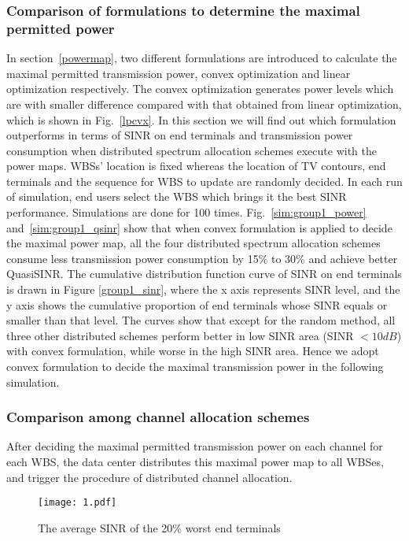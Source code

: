 \subsubsection*{Comparison of formulations to determine the maximal permitted power}
In section~\ref{powermap}, two different formulations are introduced to calculate the maximal permitted transmission power, \ie convex optimization and linear optimization respectively.
The convex optimization generates power levels which are with smaller difference compared with that obtained from linear optimization, which is shown in Fig.~\ref{lpcvx}.
In this section we will find out which formulation outperforms in terms of SINR on end terminals and transmission power consumption when distributed spectrum allocation schemes execute with the power maps.
WBSs' location is fixed whereas the location of TV contours, end terminals and the sequence for WBS to update are randomly decided.
In each run of simulation, end users select the WBS which brings it the best SINR performance.
Simulations are done for 100 times.
Fig.~\ref{sim:group1_power} and~\ref{sim:group1_qsinr} show that when convex formulation is applied to decide the maximal power map, all the four distributed spectrum allocation schemes consume less transmission power consumption by 15\% to 30\% and achieve better QuasiSINR. 
The cumulative distribution function curve of SINR on end terminals is drawn in Figure \ref{group1_sinr}, where the x axis represents SINR level, and the y axis shows the cumulative proportion of end terminals whose SINR equals or smaller than that level. 
The curves show that except for the random method, all three other distributed schemes perform better in low SINR area (SINR $<10 dB$) with convex formulation, while worse in the high SINR area. 
Hence we adopt convex formulation to decide the maximal transmission power in the following simulation.


\subsubsection*{Comparison among channel allocation schemes }
After deciding the maximal permitted transmission power on each channel for each WBS, the data center distributes this maximal power map to all WBSes, and trigger the procedure of distributed channel allocation. 
\begin{figure}[h!]
  \centering
  \texttt{[image: 1.pdf]}
  \caption{The average SINR of the 20\% worst end terminals}
\label{group1_worst20sinr}
\end{figure}


